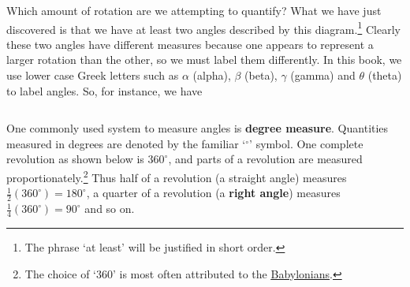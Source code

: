 \documentclass[12pt]{ximera}
\begin{document}
Which amount of rotation are we attempting to quantify?  What we have just discovered is that we have at least two angles described by this diagram.\footnote{The phrase `at least' will be justified in short order.}  Clearly these two angles have different measures because one appears to represent a larger rotation than the other, so we must label them differently.  In this book, we use lower case Greek letters such as $\alpha$ (alpha),   $\beta$ (beta),  $\gamma$ (gamma) and $\theta$ (theta) to label angles.  So, for instance, we have

\[ %
  \]

One commonly used system to measure angles is \textbf{degree measure}.  Quantities measured in degrees are denoted by the familiar `$^{\circ}$' symbol.  One complete revolution as shown below is $360^{\circ}$, and parts of a revolution are measured proportionately.\footnote{The choice of `$360$' is most often attributed to the \href{http://en.wikipedia.org/wiki/Degree_(angle)}{\underline{Babylonians}}.}  Thus half of a revolution (a straight angle) measures $\frac{1}{2} \left(360^{\circ}\right) = 180^{\circ}$, a quarter of a revolution (a \textbf{right angle}) measures $\frac{1}{4} \left(360^{\circ}\right) = 90^{\circ}$ and so on.
\end{document}
